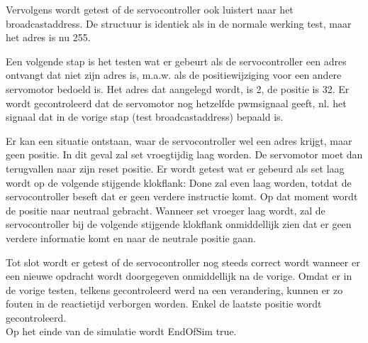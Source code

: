 
Vervolgens wordt getest of de servocontroller ook luistert naar het broadcastaddress. De structuur is identiek als in de normale werking test, maar het adres is nu 255.


Een volgende stap is het testen wat er gebeurt als de servocontroller een adres ontvangt dat niet zijn adres is, m.a.w. als de positiewijziging voor een andere servomotor bedoeld is. Het adres dat aangelegd wordt, is 2, de positie is 32\textdegree. Er wordt gecontroleerd dat de servomotor nog hetzelfde \gls{pwm}signaal geeft, nl. het signaal dat in de vorige stap (test broadcastaddress) bepaald is.


Er kan een situatie ontstaan, waar de servocontroller wel een adres krijgt, maar geen positie. In dit geval zal set vroegtijdig laag worden. De servomotor moet dan terugvallen naar zijn reset positie. Er wordt getest wat er gebeurd als set laag wordt op de volgende stijgende klokflank: Done zal even laag worden, totdat de servocontroller beseft dat er geen verdere instructie komt. Op dat moment wordt de positie naar neutraal gebracht. Wanneer set vroeger laag wordt, zal de servocontroller bij de volgende stijgende klokflank onmiddellijk zien dat er geen verdere informatie komt en naar de neutrale positie gaan.


Tot slot wordt er getest of de servocontroller nog steeds correct wordt wanneer er een nieuwe opdracht wordt doorgegeven onmiddellijk na de vorige. Omdat er in de vorige testen, telkens gecontroleerd werd na een verandering, kunnen er zo fouten in de reactietijd verborgen worden. Enkel de laatste positie wordt gecontroleerd.\\
\noindent
Op het einde van de simulatie wordt EndOfSim true.

